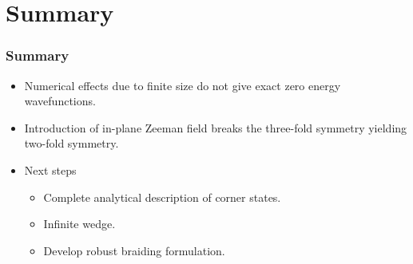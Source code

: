 \documentclass[xcolor=dvipsnames,10pt,aspectratio=169]{beamer}
\newcommand{\CO}{Summary}
\begin{document}
  \section{\CO}
  \begin{frame}
    \frametitle{Summary}
    \begin{itemize}
      \item Numerical effects due to finite size do not give exact zero energy wavefunctions.
      \item Introduction of in-plane Zeeman field breaks the three-fold symmetry yielding two-fold symmetry.
      \item Next steps
        \begin{itemize}
          \item Complete analytical description of corner states.
          \item Infinite wedge.
          \item Develop robust braiding formulation.
        \end{itemize}
    \end{itemize}
  \end{frame}


%
%
\end{document}

